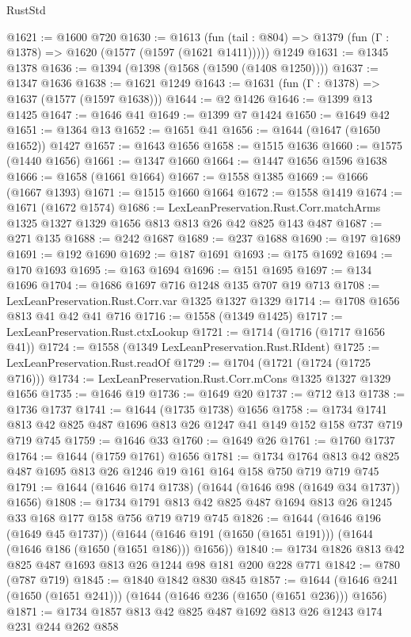 \begin{lexlean}{RustStd}
\begin{coremodule}
@1621 := @1600 @720
@1630 := @1613
    (fun (tail : @804) => @1379 (fun (Γ : @1378) => @1620 (@1577 (@1597 (@1621 @1411)))))
    @1249
@1631 := @1345 @1378
@1636 := @1394 (@1398 (@1568 (@1590 (@1408 @1250))))
@1637 := @1347 @1636
@1638 := @1621 @1249
@1643 := @1631 (fun (Γ : @1378) => @1637 (@1577 (@1597 @1638)))
@1644 := @2 @1426
@1646 := @1399 @13 @1425
@1647 := @1646 @41
@1649 := @1399 @7 @1424
@1650 := @1649 @42
@1651 := @1364 @13
@1652 := @1651 @41
@1656 := @1644 (@1647 (@1650 @1652)) @1427
@1657 := @1643 @1656
@1658 := @1515 @1636
@1660 := @1575 (@1440 @1656)
@1661 := @1347 @1660
@1664 := @1447 @1656 @1596 @1638
@1666 := @1658 (@1661 @1664)
@1667 := @1558 @1385
@1669 := @1666 (@1667 @1393)
@1671 := @1515 @1660 @1664
@1672 := @1558 @1419
@1674 := @1671 (@1672 @1574)
@1686 := LexLeanPreservation.Rust.Corr.matchArms
    @1325
    @1327
    @1329
    @1656
    @813
    @813
    @26
    @42
    @825
    @143
    @487
@1687 := @271 @135
@1688 := @242 @1687
@1689 := @237 @1688
@1690 := @197 @1689
@1691 := @192 @1690
@1692 := @187 @1691
@1693 := @175 @1692
@1694 := @170 @1693
@1695 := @163 @1694
@1696 := @151 @1695
@1697 := @134 @1696
@1704 := @1686 @1697 @716 @1248 @135 @707 @19 @713
@1708 := LexLeanPreservation.Rust.Corr.var @1325 @1327 @1329
@1714 := @1708 @1656 @813 @41 @42 @41 @716
@1716 := @1558 (@1349 @1425)
@1717 := LexLeanPreservation.Rust.ctxLookup
@1721 := @1714 (@1716 (@1717 @1656 @41))
@1724 := @1558 (@1349 LexLeanPreservation.Rust.RIdent)
@1725 := LexLeanPreservation.Rust.readOf
@1729 := @1704 (@1721 (@1724 (@1725 @716)))
@1734 := LexLeanPreservation.Rust.Corr.mCons @1325 @1327 @1329 @1656
@1735 := @1646 @19
@1736 := @1649 @20
@1737 := @712 @13
@1738 := @1736 @1737
@1741 := @1644 (@1735 @1738) @1656
@1758 := @1734 @1741 @813 @42 @825 @487 @1696 @813 @26 @1247 @41 @149 @152 @158 @737 @719 @719 @745
@1759 := @1646 @33
@1760 := @1649 @26
@1761 := @1760 @1737
@1764 := @1644 (@1759 @1761) @1656
@1781 := @1734 @1764 @813 @42 @825 @487 @1695 @813 @26 @1246 @19 @161 @164 @158 @750 @719 @719 @745
@1791 := @1644 (@1646 @174 @1738) (@1644 (@1646 @98 (@1649 @34 @1737)) @1656)
@1808 := @1734 @1791 @813 @42 @825 @487 @1694 @813 @26 @1245 @33 @168 @177 @158 @756 @719 @719 @745
@1826 := @1644
    (@1646 @196 (@1649 @45 @1737))
    (@1644 (@1646 @191 (@1650 (@1651 @191))) (@1644 (@1646 @186 (@1650 (@1651 @186))) @1656))
@1840 := @1734 @1826 @813 @42 @825 @487 @1693 @813 @26 @1244 @98 @181 @200 @228 @771
@1842 := @780 (@787 @719)
@1845 := @1840 @1842 @830 @845
@1857 := @1644 (@1646 @241 (@1650 (@1651 @241))) (@1644 (@1646 @236 (@1650 (@1651 @236))) @1656)
@1871 := @1734 @1857 @813 @42 @825 @487 @1692 @813 @26 @1243 @174 @231 @244 @262 @858

\end{coremodule}
\end{lexlean}
